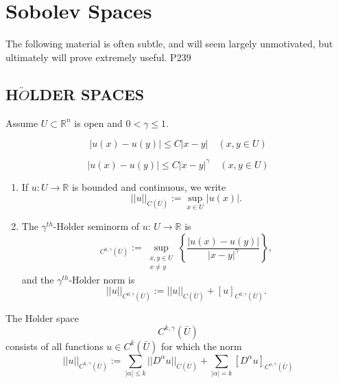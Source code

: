 \section{Sobolev Spaces}

\original
{
    The following material is often subtle, and will seem largely unmotivated, but ultimately will prove extremely useful.
}
{P239}

\subsection{H$\ddot{O}$LDER SPACES}

Assume $U\subset \mathbb{R}^n$ is open and $0<\gamma\leq1$.

\begin{equation}
    |u(x)-u(y)|\leq C|x-y |\quad
    (x,y\in U)
\end{equation}

\begin{equation}
    |u(x)-u(y) |\leq C|x-y |^{\gamma}\quad(x,y\in U)
\end{equation}

\begin{definition}
    \begin{enumerate}
        \item If $u:U\rightarrow \mathbb{R}$ is bounded and continuous, we write
        \begin{equation*}
            ||u||_{C(\bar{U})}:=\sup_{x\in U}|u(x)|.
        \end{equation*}
        \item The $\gamma^{th}$-H$\ddot{o}$lder seminorm of $u:\, U\rightarrow \mathbb{R}$ is
        \begin{equation*}
            [u]_{C^{0,\gamma}(\bar{U})}:=\sup_{\substack{x,y\in U\\x\neq y}}\left\{\frac{|u(x)-u(y)|}{|x-y|^{\gamma}}\right\},
        \end{equation*}
        and the $\gamma^{th}$-H$\ddot{o}$lder norm is
        \begin{equation*}
            ||u||_{C^{0,\gamma}(\bar{U})}:=||u||_{C(\bar{U})}+[u]_{C^{0,\gamma}(\bar{U})}.
        \end{equation*}
    \end{enumerate}
\end{definition}

\begin{definition}
    The H$\ddot{o}$lder space
    \begin{equation*}
        C^{k,\gamma}(\bar{U})
    \end{equation*}
    consists of all functions $u\in C^{k}(\bar{U})$ for which the norm
    \begin{equation}
        ||u||_{C^{k,\gamma}(\bar{U})}:=\sum_{|\alpha|\leq k}||D^{\alpha}u||_{C(\bar{U})}+\sum_{|\alpha|=k}[D^{\alpha}u]_{C^{o,\gamma}(\bar{U})}
    \end{equation}
\end{definition}

